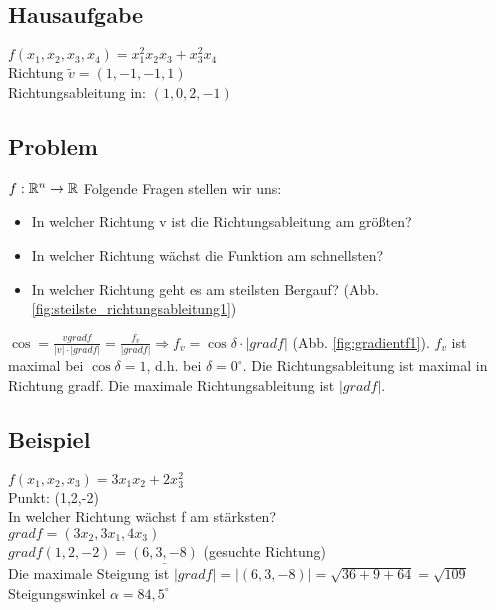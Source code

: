 \subsection{Hausaufgabe}
$ f(x_1, x_2, x_3, x_4) = x_1^2 x_2 x_3 + x_3^2 x_4$\\
Richtung $ \tilde{v} = (1,-1,-1,1) $ \\
Richtungsableitung in: $ (1,0,2,-1) $

\subsection{Problem} $ f:\mathbb{R}^n \rightarrow \mathbb{R} $
Folgende Fragen stellen wir uns: 
\begin{itemize}


\item In welcher Richtung v ist die Richtungsableitung am größten?
\item In welcher Richtung wächst die Funktion am schnellsten?
\item In welcher Richtung geht es am steilsten Bergauf? (Abb. \ref{fig:steilste_richtungsableitung1})
\end{itemize}


$ \cos = \frac{v gradf}{|v| \cdot |gradf|} = \frac{f_v}{|gradf|} \Rightarrow f_v=\cos \delta \cdot |gradf| $ (Abb. \ref{fig:gradientf1}). $f_v$ ist maximal bei $\cos \delta = 1$, d.h. bei $\delta=0^\circ$. Die Richtungsableitung ist maximal in Richtung gradf. Die maximale Richtungsableitung ist $|gradf|$. 

\subsection{Beispiel}
$ f(x_1,x_2,x_3) = 3x_1x_2 + 2x_3^2 $\\
Punkt: (1,2,-2)\\
In welcher Richtung wächst f am stärksten? \\
$ gradf = (3x_2, 3x_1, 4x_3) $\\
$ gradf(1,2,-2) = \underline{(6,3,-8)} $ (gesuchte Richtung)\\
Die maximale Steigung ist $ |gradf| = |(6,3,-8)| = \sqrt{36+9+64} = \sqrt{109} $\\
Steigungswinkel $\alpha = 84,5^\circ $ 

